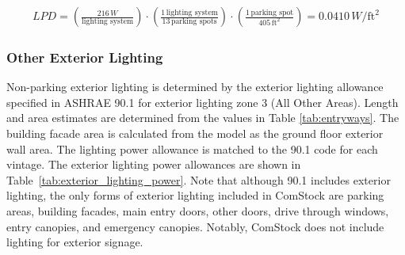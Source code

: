 \begin{align}
\label{ext_light_eqn}
LPD = \left(\frac{216\,W}{\text{lighting system}}\right) \cdot \left(\frac{1\,\text{lighting system}}{13\,\text{parking spots}}\right) \cdot \left(\frac{1\,\text{parking spot}}{405\,\text{ft}^2}\right) = 0.0410\,W/\text{ft}^2
\end{align}


\subsubsection{Other Exterior Lighting}
Non-parking exterior lighting is determined by the exterior lighting allowance specified in ASHRAE 90.1 for exterior lighting zone 3 (All Other Areas). Length and area estimates are determined from the values in Table \ref{tab:entryways}. The building facade area is calculated from the model as the ground floor exterior wall area. The lighting power allowance is matched to the 90.1 code for each vintage. The exterior lighting power allowances are shown in Table~\ref{tab:exterior_lighting_power}. Note that although 90.1 includes exterior lighting, the only forms of exterior lighting included in ComStock are parking areas, building facades, main entry doors, other doors, drive through windows, entry canopies, and emergency canopies. Notably, ComStock does not include lighting for exterior signage.
